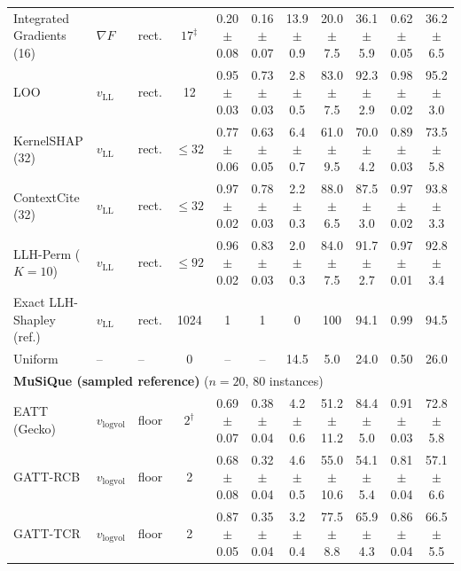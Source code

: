 \begin{table}[t]
{\begin{tabular}{lllcccccccc}
Integrated Gradients (16) & $\nabla F$ & rect. & $17^\ddagger$ & 0.20{\scriptsize$\pm$0.08} & 0.16{\scriptsize$\pm$0.07} & 13.9{\scriptsize$\pm$0.9} & 20.0{\scriptsize$\pm$7.5} & 36.1{\scriptsize$\pm$5.9} & 0.62{\scriptsize$\pm$0.05} & 36.2{\scriptsize$\pm$6.5} \\
LOO & $v_{\mathrm{LL}}$ & rect. & 12 & 0.95{\scriptsize$\pm$0.03} & 0.73{\scriptsize$\pm$0.03} & 2.8{\scriptsize$\pm$0.5} & 83.0{\scriptsize$\pm$7.5} & 92.3{\scriptsize$\pm$2.9} & 0.98{\scriptsize$\pm$0.02} & 95.2{\scriptsize$\pm$3.0} \\
KernelSHAP (32) & $v_{\mathrm{LL}}$ & rect. & $\le 32$ & 0.77{\scriptsize$\pm$0.06} & 0.63{\scriptsize$\pm$0.05} & 6.4{\scriptsize$\pm$0.7} & 61.0{\scriptsize$\pm$9.5} & 70.0{\scriptsize$\pm$4.2} & 0.89{\scriptsize$\pm$0.03} & 73.5{\scriptsize$\pm$5.8} \\
ContextCite (32) & $v_{\mathrm{LL}}$ & rect. & $\le 32$ & 0.97{\scriptsize$\pm$0.02} & 0.78{\scriptsize$\pm$0.03} & 2.2{\scriptsize$\pm$0.3} & 88.0{\scriptsize$\pm$6.5} & 87.5{\scriptsize$\pm$3.0} & 0.97{\scriptsize$\pm$0.02} & 93.8{\scriptsize$\pm$3.3} \\
LLH-Perm ($K=10$) & $v_{\mathrm{LL}}$ & rect. & $\le 92$ & 0.96{\scriptsize$\pm$0.02} & 0.83{\scriptsize$\pm$0.03} & 2.0{\scriptsize$\pm$0.3} & 84.0{\scriptsize$\pm$7.5} & 91.7{\scriptsize$\pm$2.7} & 0.97{\scriptsize$\pm$0.01} & 92.8{\scriptsize$\pm$3.4} \\
Exact LLH-Shapley (ref.) & $v_{\mathrm{LL}}$ & rect. & 1024 & 1 & 1 & 0 & 100 & 94.1 & 0.99 & 94.5 \\
Uniform & -- & -- & 0 & -- & -- & 14.5 & 5.0 & 24.0 & 0.50 & 26.0 \\
\midrule
\multicolumn{11}{l}{\textbf{MuSiQue (sampled reference)} ($n = 20$, 80 instances)} \\
EATT (Gecko) & $v_{\mathrm{logvol}}$ & floor & $2^\dagger$ & 0.69{\scriptsize$\pm$0.07} & 0.38{\scriptsize$\pm$0.04} & 4.2{\scriptsize$\pm$0.6} & 51.2{\scriptsize$\pm$11.2} & 84.4{\scriptsize$\pm$5.0} & 0.91{\scriptsize$\pm$0.03} & 72.8{\scriptsize$\pm$5.8} \\
GATT-RCB & $v_{\mathrm{logvol}}$ & floor & 2 & 0.68{\scriptsize$\pm$0.08} & 0.32{\scriptsize$\pm$0.04} & 4.6{\scriptsize$\pm$0.5} & 55.0{\scriptsize$\pm$10.6} & 54.1{\scriptsize$\pm$5.4} & 0.81{\scriptsize$\pm$0.04} & 57.1{\scriptsize$\pm$6.6} \\
GATT-TCR & $v_{\mathrm{logvol}}$ & floor & 2 & 0.87{\scriptsize$\pm$0.05} & 0.35{\scriptsize$\pm$0.04} & 3.2{\scriptsize$\pm$0.4} & 77.5{\scriptsize$\pm$8.8} & 65.9{\scriptsize$\pm$4.3} & 0.86{\scriptsize$\pm$0.04} & 66.5{\scriptsize$\pm$5.5} \\

\end{tabular}}
\end{table}
